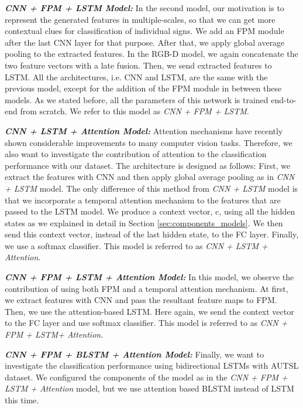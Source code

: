 \documentclass[11pt, a4paper, singlecolumn]{article}
\begin{document}
\textit{\textbf{CNN + FPM + LSTM Model: }} In the second model, our motivation is to represent the generated features in multiple-scales, so that we can get more contextual clues for classification of individual signs. We add an FPM module after the last CNN layer for that purpose. After that, we apply global average pooling to the extracted features. In the RGB-D model, we again concatenate the two feature vectors with a late fusion. Then, we send extracted features to LSTM. All the architectures, i.e. CNN and LSTM, are the same with the previous model, except for the addition of the FPM module in between these models. As we stated before, all the parameters of this network is trained end-to-end from scratch. We refer to this model as \textit{CNN + FPM + LSTM}.


\textit{\textbf{CNN + LSTM + Attention Model: }} Attention mechanisms have recently shown considerable improvements to many computer vision tasks. Therefore, we also want to investigate the contribution of attention to the classification performance with our dataset. The architecture is designed as follows: First, we extract the features with CNN and then apply global average pooling as in \textit{CNN + LSTM} model. The only difference of this method from \textit{CNN + LSTM} model is that we incorporate a temporal attention mechanism to the features that are passed to the LSTM model. We produce a context vector, c, using all the hidden states as we explained in detail in Section \ref{sec:components_models}. We then send this context vector, instead of the last hidden state, to the FC layer. Finally, we use a softmax classifier. This model is referred to as \textit{CNN + LSTM + Attention}.

\textit{\textbf{CNN + FPM + LSTM + Attention Model: }} In this model, we observe the contribution of using both FPM and a temporal attention mechanism. At first, we extract features with CNN and pass the resultant feature maps to FPM. Then, we use the attention-based LSTM. Here again, we send the context vector to the FC layer and use softmax classifier. This model is referred to as \textit{CNN + FPM + LSTM+ Attention}.

\textit{\textbf{CNN + FPM + BLSTM + Attention Model: }} Finally, we want to investigate the classification performance using bidirectional LSTMs with AUTSL dataset. We configured the components of the model as in the \textit{CNN + FPM + LSTM + Attention} model, but we use attention based BLSTM instead of LSTM this time.
\end{document}
